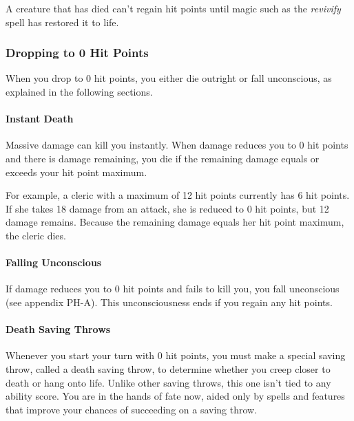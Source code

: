\documentclass[
]{article}
\begin{document}
A creature that has died can't regain hit points until magic such as the
\emph{revivify} spell has restored it to life.

\hypertarget{dropping-to-0-hit-points}{%
\subsubsection{Dropping to 0 Hit
Points}\label{dropping-to-0-hit-points}}

When you drop to 0 hit points, you either die outright or fall
unconscious, as explained in the following sections.

\hypertarget{instant-death}{%
\paragraph{Instant Death}\label{instant-death}}

Massive damage can kill you instantly. When damage reduces you to 0 hit
points and there is damage remaining, you die if the remaining damage
equals or exceeds your hit point maximum.

For example, a cleric with a maximum of 12 hit points currently has 6
hit points. If she takes 18 damage from an attack, she is reduced to 0
hit points, but 12 damage remains. Because the remaining damage equals
her hit point maximum, the cleric dies.

\hypertarget{falling-unconscious}{%
\paragraph{Falling Unconscious}\label{falling-unconscious}}

If damage reduces you to 0 hit points and fails to kill you, you fall
unconscious (see appendix PH-A). This unconsciousness ends if you regain
any hit points.

\hypertarget{death-saving-throws}{%
\paragraph{Death Saving Throws}\label{death-saving-throws}}

Whenever you start your turn with 0 hit points, you must make a special
saving throw, called a death saving throw, to determine whether you
creep closer to death or hang onto life. Unlike other saving throws,
this one isn't tied to any ability score. You are in the hands of fate
now, aided only by spells and features that improve your chances of
succeeding on a saving throw.
\end{document}
